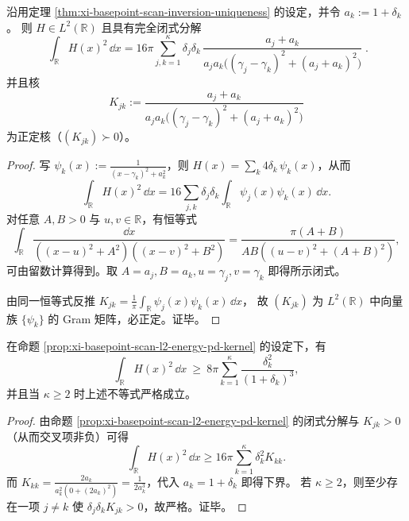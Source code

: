 \begin{proposition}\label{prop:xi-basepoint-scan-l2-energy-pd-kernel}
沿用定理 \ref{thm:xi-basepoint-scan-inversion-uniqueness} 的设定，并令 \(a_k:=1+\delta_k\)。
则 \(H\in L^{2}(\mathbb{R})\) 且具有完全闭式分解
\[
\boxed{\;
\int_{\mathbb{R}}H(x)^{2}\,\dd x
=16\pi\sum_{j,k=1}^{\kappa}\delta_j\delta_k\,
\frac{a_j+a_k}{a_ja_k\bigl((\gamma_j-\gamma_k)^{2}+(a_j+a_k)^{2}\bigr)}\; }.
\]
并且核
\[
K_{jk}:=\frac{a_j+a_k}{a_ja_k\bigl((\gamma_j-\gamma_k)^{2}+(a_j+a_k)^{2}\bigr)}
\]
为正定核（\((K_{jk})\succ 0\)）。
\end{proposition}
\begin{proof}
写 \(\psi_k(x):=\frac{1}{(x-\gamma_k)^2+a_k^2}\)，则 \(H(x)=\sum_k 4\delta_k\,\psi_k(x)\)，从而
\[
\int_{\mathbb{R}}H(x)^2\,\dd x
=16\sum_{j,k}\delta_j\delta_k\int_{\mathbb{R}}\psi_j(x)\psi_k(x)\,\dd x.
\]
对任意 \(A,B>0\) 与 \(u,v\in\mathbb{R}\)，有恒等式
\[
\int_{\mathbb{R}}\frac{\dd x}{((x-u)^{2}+A^{2})((x-v)^{2}+B^{2})}
=\frac{\pi(A+B)}{AB((u-v)^{2}+(A+B)^{2})},
\]
可由留数计算得到。取 \(A=a_j,B=a_k,u=\gamma_j,v=\gamma_k\) 即得所示闭式。
\par
由同一恒等式反推
\(
K_{jk}=\frac{1}{\pi}\int_{\mathbb{R}}\psi_j(x)\psi_k(x)\,\dd x
\)，
故 \((K_{jk})\) 为 \(L^2(\mathbb{R})\) 中向量族 \(\{\psi_k\}\) 的 Gram 矩阵，必正定。证毕。
\end{proof}

\begin{corollary}\label{cor:xi-basepoint-scan-l2-energy-diagonal-lower-bound}
在命题 \ref{prop:xi-basepoint-scan-l2-energy-pd-kernel} 的设定下，有
\[
\int_{\mathbb{R}}H(x)^{2}\,\dd x
\ \ge\ 8\pi\sum_{k=1}^{\kappa}\frac{\delta_k^{2}}{(1+\delta_k)^{3}},
\]
并且当 \(\kappa\ge 2\) 时上述不等式严格成立。
\end{corollary}
\begin{proof}
由命题 \ref{prop:xi-basepoint-scan-l2-energy-pd-kernel} 的闭式分解与 \(K_{jk}>0\)（从而交叉项非负）可得
\[
\int_{\mathbb{R}}H(x)^{2}\,\dd x\ge 16\pi\sum_{k=1}^{\kappa}\delta_k^2 K_{kk}.
\]
而
\(
K_{kk}=\frac{2a_k}{a_k^2(0+(2a_k)^2)}=\frac{1}{2a_k^3}
\)，代入 \(a_k=1+\delta_k\) 即得下界。
若 \(\kappa\ge 2\)，则至少存在一项 \(j\neq k\) 使 \(\delta_j\delta_k K_{jk}>0\)，故严格。证毕。
\end{proof}

